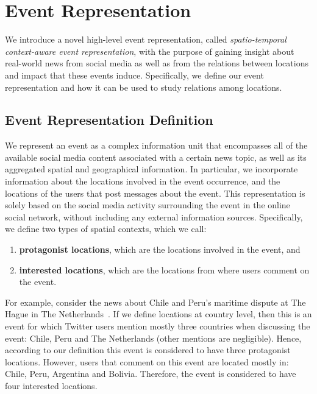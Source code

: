\section{Event Representation}\label{sec:geo:model}

We introduce a novel high-level event representation, called {\em
spatio-temporal context-aware event representation}, with the purpose of gaining
insight about real-world news from social media as well as from the relations
between locations and impact that these events induce. 
%
Specifically, we define our event representation and how it can be used to study
relations among locations.

\subsection{Event Representation Definition}\label{sec:model_definition}

We represent an event as a complex information unit that encompasses all of the
available social media content associated with a certain news topic, as well as
its aggregated spatial and geographical information.
%
%
%
In particular, we incorporate information about the locations involved in the
event occurrence, and the locations of the users that post messages about the
event. 
%
This representation is solely based on the social media activity surrounding the
event in the online social network, without including any external information
sources.
%
Specifically, we define two types of spatial contexts, which we call:
\begin{enumerate}
\item {\bf protagonist locations}, which are the locations involved in the
event, and
\item {\bf interested locations}, which are the locations from where users
comment on the event.
\end{enumerate}

For example, consider the news about Chile and Peru's maritime dispute at The
Hague in The Netherlands~\cite{bbc_peruchile}. 
%
If we define locations at country level, then this is an event for which Twitter
users mention mostly three countries when discussing the event: Chile, Peru and
The Netherlands (other mentions are negligible). 
%
Hence, according to our definition this event is considered to have three
protagonist locations. 
%
However, users that comment on this event are located mostly in: Chile, Peru,
Argentina and Bolivia. 
%
Therefore, the event is considered to have four interested locations.

